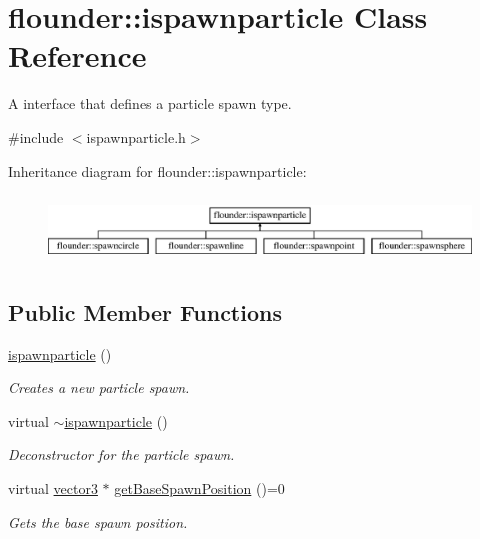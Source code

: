 \hypertarget{classflounder_1_1ispawnparticle}{}\section{flounder\+:\+:ispawnparticle Class Reference}
\label{classflounder_1_1ispawnparticle}


A interface that defines a particle spawn type.  




{\ttfamily \#include $<$ispawnparticle.\+h$>$}

Inheritance diagram for flounder\+:\+:ispawnparticle\+:\begin{figure}[H]
\begin{center}
\leavevmode
\includegraphics[height=1.818182cm]{classflounder_1_1ispawnparticle}
\end{center}
\end{figure}
\subsection*{Public Member Functions}
\begin{DoxyCompactItemize}
\item 
\hyperlink{classflounder_1_1ispawnparticle_a1e2da8a80d66a3d5c5e4c17cbddd897f}{ispawnparticle} ()
\begin{DoxyCompactList}\small\item\em Creates a new particle spawn. \end{DoxyCompactList}\item 
virtual \hyperlink{classflounder_1_1ispawnparticle_ae003a3a839fe693d42a84035a7cf4c52}{$\sim$ispawnparticle} ()
\begin{DoxyCompactList}\small\item\em Deconstructor for the particle spawn. \end{DoxyCompactList}\item 
virtual \hyperlink{classflounder_1_1vector3}{vector3} $\ast$ \hyperlink{classflounder_1_1ispawnparticle_a3e59019906bbb5ba8df82a4f6e847ef6}{get\+Base\+Spawn\+Position} ()=0
\begin{DoxyCompactList}\small\item\em Gets the base spawn position. \end{DoxyCompactList}\end{DoxyCompactItemize}



